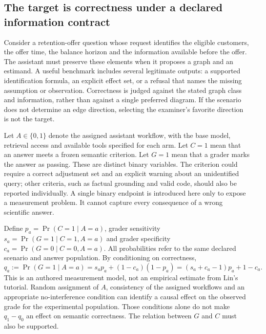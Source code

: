 \subsection{The target is correctness under a declared information contract}
\label{exec20:validity-target}

Consider a retention-offer question whose request identifies the eligible
customers, the offer time, the balance horizon and the information available
before the offer. The assistant must preserve these elements when it proposes
a graph and an estimand. A useful benchmark includes several legitimate outputs:
a supported identification formula, an explicit effect set, or a refusal that
names the missing assumption or observation. Correctness is judged against the
stated graph class and information, rather than against a single preferred
diagram. If the scenario does not determine an edge direction, selecting the
examiner's favorite direction is not the target.

Let $A\in\{0,1\}$ denote the assigned assistant workflow, with the base model,
retrieval access and available tools specified for each arm. Let $C=1$ mean that
an answer meets a frozen semantic criterion. Let $G=1$ mean that a grader marks
the answer as passing. These are distinct binary variables. The criterion
could require a correct adjustment set and an explicit warning about an
unidentified query; other criteria, such as factual grounding and valid code,
should also be reported individually. A single binary endpoint is introduced
here only to expose a measurement problem. It cannot capture every consequence
of a wrong scientific answer.

Define $p_a=\Pr(C=1\mid A=a)$, grader sensitivity
$s_a=\Pr(G=1\mid C=1,A=a)$ and grader specificity
$c_a=\Pr(G=0\mid C=0,A=a)$. All probabilities refer to the same declared
scenario and answer population. By conditioning on correctness,
\begin{equation}
 q_a:=\Pr(G=1\mid A=a)
 =s_a p_a+(1-c_a)(1-p_a)
 =(s_a+c_a-1)p_a+1-c_a .
 \label{exec20:validity-measurement}
\end{equation}
This is an authored measurement model, not an empirical estimate from Lin's
tutorial. Random assignment of $A$, consistency of the assigned workflows and
an appropriate no-interference condition can identify a causal effect on the
observed grade for the experimental population. Those conditions alone do not
make $q_1-q_0$ an effect on semantic correctness. The relation between $G$ and
$C$ must also be supported. \citep{exec20_validity_reference}

